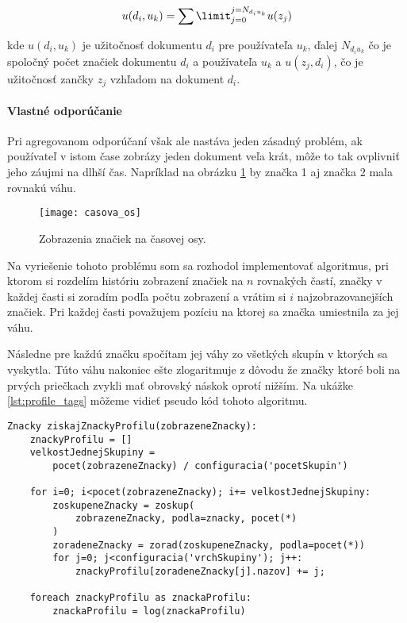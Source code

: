 \begin{equation}\label{eq:aggregated_recommendation}
u(d_i, u_k) = \sum\limit_{j = 0}^{j = N_{d_i u_k}} u(z_j)
\end{equation}

kde \(u(d_i, u_k)\) je užitočnosť dokumentu \(d_i\) pre používateľa \(u_k\),
ďalej \(N_{d_i u_k}\) čo je spoločný počet značiek dokumentu \(d_i\) a používateľa
\(u_k\) a \(u(z_j, d_i)\), čo je užitočnosť zančky \(z_j\) vzhľadom na dokument 
\(d_i\).

\paragraph{Vlastné odporúčanie}

Pri agregovanom odporúčaní však ale nastáva jeden zásadný problém, 
ak používateľ v istom čase zobrázy jeden dokument veľa krát, môže to tak ovplivniť 
jeho záujmi na dlhší čas. Napríklad na obrázku \ref{fig:casova_os} by značka 1 aj
značka 2 mala rovnakú váhu.

\begin{figure}
    \begin{center}
        \texttt{[image: casova\_os]}
        \caption{Zobrazenia značiek na časovej osy.}
        \label{fig:casova_os}
    \end{center}
\end{figure}

Na vyriešenie tohoto problému som sa rozhodol implementovať algoritmus, pri ktorom si 
rozdelím históriu zobrazení značiek na \(n\) rovnakých častí, značky v každej časti 
si zoradím podľa počtu zobrazení a vrátim si \(i\) najzobrazovanejších značiek. 
Pri každej časti považujem pozíciu na ktorej sa značka umiestnila za jej váhu.

Následne pre každú značku spočítam jej váhy zo všetkých skupín v ktorých sa vyskytla. 
Túto váhu nakoniec ešte zlogaritmuje z dôvodu že značky ktoré boli na prvých priečkach 
zvykli mať obrovský náskok oprotí nižším. Na ukážke \ref{lst:profile_tags} môžeme
vidieť pseudo kód tohoto algoritmu.

\begin{lstlisting}[label=lst:profile_tags, caption=Získanie značiek profilu]
Znacky ziskajZnackyProfilu(zobrazeneZnacky):
    znackyProfilu = []
    velkostJednejSkupiny = 
        pocet(zobrazeneZnacky) / configuracia('pocetSkupin')

    for i=0; i<pocet(zobrazeneZnacky); i+= velkostJednejSkupiny:
        zoskupeneZnacky = zoskup(
            zobrazeneZnacky, podla=znacky, pocet(*)
        )
        zoradeneZnacky = zorad(zoskupeneZnacky, podla=pocet(*))
        for j=0; j<configuracia('vrchSkupiny'); j++:
            znackyProfilu[zoradeneZnacky[j].nazov] += j;
    
    foreach znackyProfilu as znackaProfilu:
        znackaProfilu = log(znackaProfilu)
\end{lstlisting}

